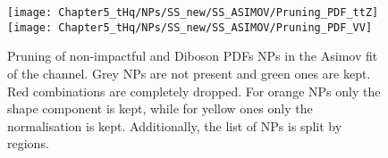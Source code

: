 \begin{figure}[h]
  \centering
  \texttt{[image: Chapter5\_tHq/NPs/SS\_new/SS\_ASIMOV/Pruning\_PDF\_ttZ]}\hfill
  \texttt{[image: Chapter5\_tHq/NPs/SS\_new/SS\_ASIMOV/Pruning\_PDF\_VV]}
   \caption{Pruning of non-impactful \ttZ and Diboson PDFs NPs in the Asimov fit of the \dilepSStau channel. Grey NPs are 
   not present and green ones are kept. Red combinations are completely dropped. For orange NPs only the shape 
   component is kept, while for yellow ones only the normalisation is kept. Additionally, the list of NPs is split by regions.}
  \label{fig:Appendix:AdditionalResults:SS:Asimov:Pruning:ttZPDF}
\end{figure}


